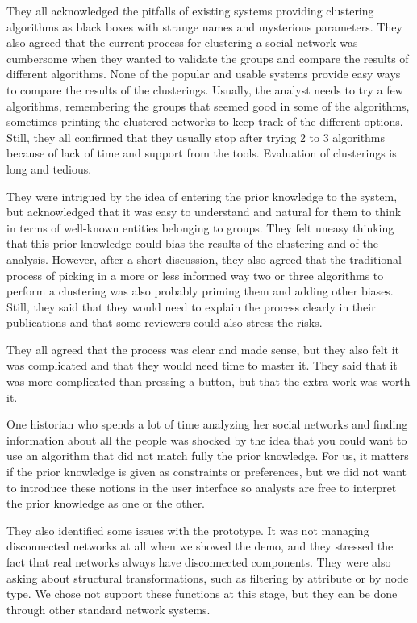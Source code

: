 They all acknowledged the pitfalls of existing systems providing clustering algorithms as black boxes with strange names and mysterious parameters.
They also agreed that the current process for clustering a social network was cumbersome when they wanted to validate the groups and compare the results of different algorithms. None of the popular and usable systems provide easy ways to compare the results of the clusterings. Usually, the analyst needs to try a few algorithms, remembering the groups that seemed good in some of the algorithms, sometimes printing the clustered networks to keep track of the different options. Still, they all confirmed that they usually stop after trying 2 to 3 algorithms because of lack of time and support from the tools. Evaluation of clusterings is long and tedious.

They were intrigued by the idea of entering the prior knowledge to the system, but acknowledged that it was easy to understand and natural for them to think in terms of well-known entities belonging to groups. They felt uneasy thinking that this prior knowledge could bias the results of the clustering and of the analysis. However, after a short discussion, they also agreed that the traditional process of picking in a more or less informed way two or three algorithms to perform a clustering was also probably priming them and adding other biases. Still, they said that they would need to explain the process clearly in their publications and that some reviewers could also stress the risks.

They all agreed that the process was clear and made sense, but they also felt it was complicated and that they would need time to master it. They said that it was more complicated than pressing a button, but that the extra work was worth it.

One historian who spends a lot of time analyzing her social networks and finding information about all the people was shocked by the idea that you could want to use an algorithm that did not match fully the prior knowledge. For us, it matters if the prior knowledge is given as constraints or preferences, but we did not want to introduce these notions in the user interface so analysts are free to interpret the prior knowledge as one or the other.

They also identified some issues with the prototype. It was not managing disconnected networks at all when we showed the demo, and they stressed the fact that real networks always have disconnected components. They were also asking about structural transformations, such as filtering by attribute or by node type. We chose not support these functions at this stage, but they can be done through other standard network systems.

